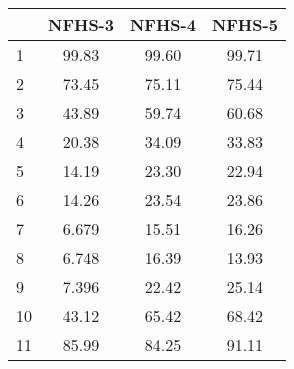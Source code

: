 \begin{tabular}{l*{3}{c}}
\toprule
            &\multicolumn{1}{c}{NFHS-3}&\multicolumn{1}{c}{NFHS-4}&\multicolumn{1}{c}{NFHS-5}\\
\midrule
\midrule
1           &       99.83&       99.60&       99.71\\
2           &       73.45&       75.11&       75.44\\
3           &       43.89&       59.74&       60.68\\
4           &       20.38&       34.09&       33.83\\
5           &       14.19&       23.30&       22.94\\
6           &       14.26&       23.54&       23.86\\
7           &       6.679&       15.51&       16.26\\
8           &       6.748&       16.39&       13.93\\
9           &       7.396&       22.42&       25.14\\
10          &       43.12&       65.42&       68.42\\
11          &       85.99&       84.25&       91.11\\
\bottomrule
\end{tabular}
